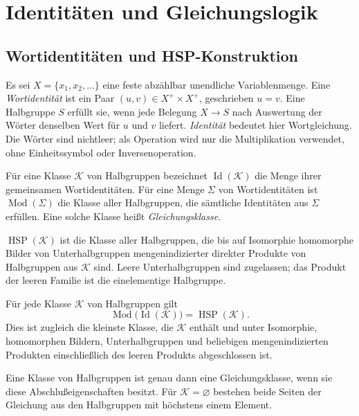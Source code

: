 \chapter{Identitäten und Gleichungslogik}

\section{Wortidentitäten und HSP-Konstruktion}

\begin{definition}
Es sei $X=\{x_1,x_2,\ldots\}$ eine feste abzählbar unendliche
Variablenmenge. Eine \emph{Wortidentität} ist ein Paar $(u,v)\in X^+\times X^+$,
geschrieben $u=v$. Eine Halbgruppe $S$ erfüllt sie, wenn jede Belegung
$X\to S$ nach Auswertung der Wörter denselben Wert für $u$ und $v$ liefert.
\emph{Identität} bedeutet hier Wortgleichung. Die Wörter sind nichtleer;
als Operation wird nur die Multiplikation verwendet, ohne
Einheitssymbol oder Inversenoperation.

Für eine Klasse $\mathcal K$ von Halbgruppen bezeichnet
$\operatorname{Id}(\mathcal K)$ die Menge ihrer gemeinsamen
Wortidentitäten. Für eine Menge $\Sigma$ von Wortidentitäten ist
$\operatorname{Mod}(\Sigma)$ die Klasse aller Halbgruppen, die sämtliche
Identitäten aus $\Sigma$ erfüllen. Eine solche Klasse heißt
\emph{Gleichungsklasse}.
\end{definition}

\begin{definition}
$\operatorname{HSP}(\mathcal K)$ ist die Klasse aller Halbgruppen,
die bis auf Isomorphie homomorphe Bilder von Unterhalbgruppen
mengenindizierter direkter Produkte von Halbgruppen aus $\mathcal K$ sind.
Leere Unterhalbgruppen sind zugelassen;
das Produkt der leeren Familie ist die einelementige Halbgruppe.
\end{definition}

\begin{theorem}
\label{b28guide:thm:hsp}
Für jede Klasse $\mathcal K$ von Halbgruppen gilt
\[
 \operatorname{Mod}\bigl(\operatorname{Id}(\mathcal K)\bigr)
 =\operatorname{HSP}(\mathcal K).
\]
Dies ist zugleich die kleinste Klasse, die $\mathcal K$ enthält und
unter Isomorphie, homomorphen Bildern, Unterhalbgruppen und beliebigen
mengenindizierten Produkten einschließlich des leeren Produkts
abgeschlossen ist.

Eine Klasse von Halbgruppen ist genau dann eine Gleichungsklasse,
wenn sie diese Abschlußeigenschaften besitzt.
Für $\mathcal K=\varnothing$ bestehen beide Seiten der Gleichung
aus den Halbgruppen mit höchstens einem Element.
\cite{birkhoff1935,burris}
\end{theorem}

